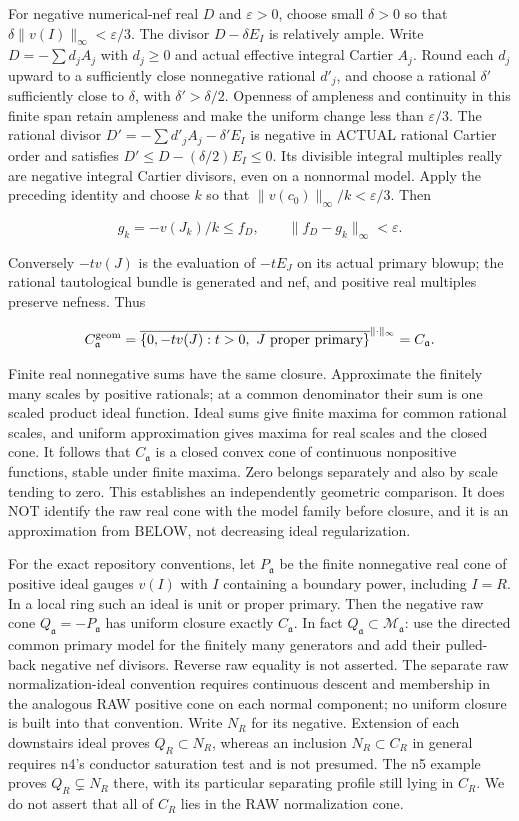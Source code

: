 \documentclass[11pt]{article}
\begin{document}
For negative numerical-nef real $D$ and $\varepsilon>0$, choose small $\delta>0$ so that $\delta\|v(I)\|_\infty<\varepsilon/3$. The divisor $D-\delta E_I$ is relatively ample. Write $D=-\sum d_j A_j$ with $d_j\ge0$ and actual effective integral Cartier $A_j$. Round each $d_j$ upward to a sufficiently close nonnegative rational $d'_j$, and choose a rational $\delta'$ sufficiently close to $\delta$, with $\delta'>\delta/2$. Openness of ampleness and continuity in this finite span retain ampleness and make the uniform change less than $\varepsilon/3$. The rational divisor $D'=-\sum d'_j A_j-\delta'E_I$ is negative in ACTUAL rational Cartier order and satisfies $D'\le D-(\delta/2)E_I\le0$. Its divisible integral multiples really are negative integral Cartier divisors, even on a nonnormal model. Apply the preceding identity and choose $k$ so that $\|v(c_0)\|_\infty/k<\varepsilon/3$. Then

\[
g_k=-v(J_k)/k\le f_D,\qquad \|f_D-g_k\|_\infty<\varepsilon.
\]

Conversely $-t v(J)$ is the evaluation of $-tE_J$ on its actual primary blowup; the rational tautological bundle is generated and nef, and positive real multiples preserve nefness. Thus

\[
C_{\mathfrak a}^{\rm geom}=\overline{\{0,-t v(J):t>0,\ J\text{ proper primary}\}}^{\|\cdot\|_\infty}=C_{\mathfrak a}.
\]

Finite real nonnegative sums have the same closure. Approximate the finitely many scales by positive rationals; at a common denominator their sum is one scaled product ideal function. Ideal sums give finite maxima for common rational scales, and uniform approximation gives maxima for real scales and the closed cone. It follows that $C_{\mathfrak a}$ is a closed convex cone of continuous nonpositive functions, stable under finite maxima. Zero belongs separately and also by scale tending to zero. This establishes an independently geometric comparison. It does NOT identify the raw real cone with the model family before closure, and it is an approximation from BELOW, not decreasing ideal regularization.

For the exact repository conventions, let $P_{\mathfrak a}$ be the finite nonnegative real cone of positive ideal gauges $v(I)$ with $I$ containing a boundary power, including $I=R$. In a local ring such an ideal is unit or proper primary. Then the negative raw cone $Q_{\mathfrak a}=-P_{\mathfrak a}$ has uniform closure exactly $C_{\mathfrak a}$. In fact $Q_{\mathfrak a}\subset\mathcal M_{\mathfrak a}$: use the directed common primary model for the finitely many generators and add their pulled-back negative nef divisors. Reverse raw equality is not asserted. The separate raw normalization-ideal convention requires continuous descent and membership in the analogous RAW positive cone on each normal component; no uniform closure is built into that convention. Write $N_R$ for its negative. Extension of each downstairs ideal proves $Q_R\subset N_R$, whereas an inclusion $N_R\subset C_R$ in general requires n4's conductor saturation test and is not presumed. The n5 example proves $Q_R\subsetneq N_R$ there, with its particular separating profile still lying in $C_R$. We do not assert that all of $C_R$ lies in the RAW normalization cone.
\end{document}
